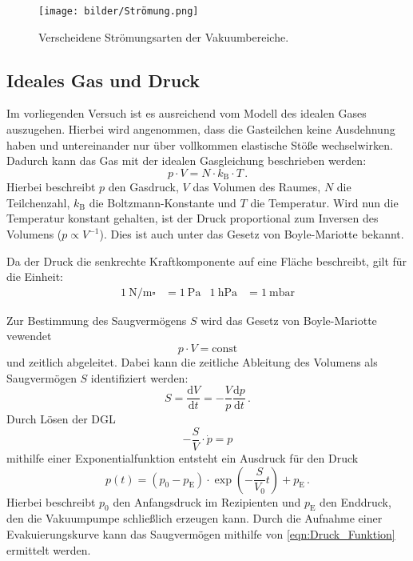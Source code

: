         \begin{figure}
            \centering
            \texttt{[image: bilder/Strömung.png]}
            \caption{Verscheidene Strömungsarten der Vakuumbereiche.\cite{Pfeiffer}}
            \label{fig:Strömung}
        \end{figure}

    \subsection{Ideales Gas und Druck}
        Im vorliegenden Versuch ist es ausreichend vom Modell des idealen Gases auszugehen.
        Hierbei wird angenommen, dass die Gasteilchen keine Ausdehnung haben und untereinander nur über vollkommen elastische Stöße wechselwirken.
        Dadurch kann das Gas mit der idealen Gasgleichung beschrieben werden:
        \begin{equation*}
            p \cdot V = N \cdot k_\text{B} \cdot T \, .
        \end{equation*}
        Hierbei beschreibt $p$ den Gasdruck, $V$ das Volumen des Raumes, $N$ die Teilchenzahl, $k_\text{B}$ die Boltzmann-Konstante und $T$ die Temperatur.
        Wird nun die Temperatur konstant gehalten, ist der Druck proportional zum Inversen des Volumens ($p \propto V^{-1}$).
        Dies ist auch unter das Gesetz von Boyle-Mariotte bekannt.

        \noindent
        Da der Druck die senkrechte Kraftkomponente auf eine Fläche beschreibt, gilt für die Einheit:
        \begin{align*}
            \SI{1}{\newton\per\metre\square} &= \SI{1}{\pascal}& \SI{1}{\hecto\pascal} &= \SI{1}{\milli\bar} 
        \end{align*}

        \noindent
        Zur Bestimmung des Saugvermögens $S$ wird das Gesetz von Boyle-Mariotte vewendet
        \begin{equation*}
            p \cdot V = \text{const}
        \end{equation*}
        und zeitlich abgeleitet.
        Dabei kann die zeitliche Ableitung des Volumens als Saugvermögen $S$ identifiziert werden:
        \begin{equation*}
            S = \frac{\text{d}V}{\text{d}t} = - \frac{V}{p} \frac{\text{d}p}{\text{d}t} \, .
        \end{equation*}
        Durch Lösen der DGL
        \begin{equation}
            - \frac{S}{V} \cdot \dot{p} = p
            \label{eqn:saug_eva_theo}
        \end{equation}
        mithilfe einer Exponentialfunktion entsteht ein Ausdruck für den Druck
        \begin{equation}
            p(t) = (p_0 - p_\text{E}) \cdot \exp{(- \frac{S}{V_0}t)} +p_\text{E} \, .
            \label{eqn:Druck_Funktion}
        \end{equation}
        Hierbei beschreibt $p_0$ den Anfangsdruck im Rezipienten und $p_\text{E}$ den Enddruck, den die Vakuumpumpe schließlich erzeugen kann.
        Durch die Aufnahme einer Evakuierungskurve kann das Saugvermögen mithilfe von \eqref{eqn:Druck_Funktion} ermittelt werden.

